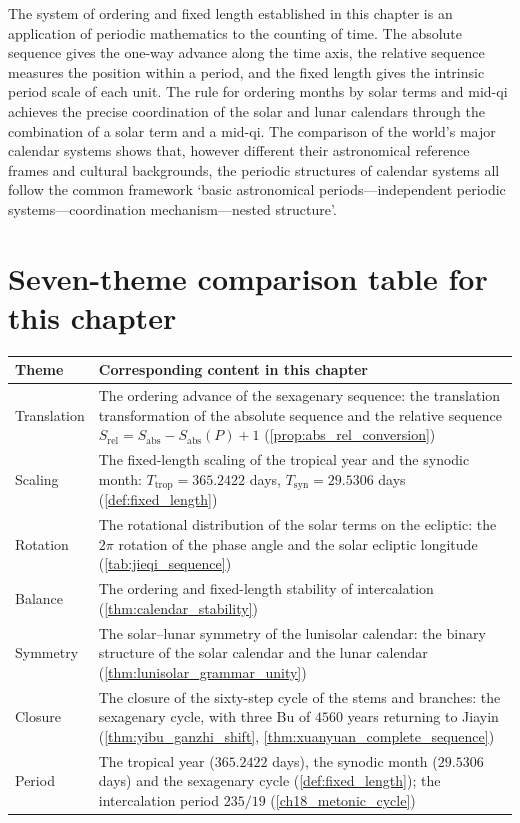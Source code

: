 \begin{remark}\label{rem:calendar_book_interface}
The system of ordering and fixed length established in this chapter is an application of periodic mathematics to the counting of time. The absolute sequence gives the one-way advance along the time axis, the relative sequence measures the position within a period, and the fixed length gives the intrinsic period scale of each unit. The rule for ordering months by solar terms and mid-qi achieves the precise coordination of the solar and lunar calendars through the combination of a solar term and a mid-qi. The comparison of the world's major calendar systems shows that, however different their astronomical reference frames and cultural backgrounds, the periodic structures of calendar systems all follow the common framework `basic astronomical periods---independent periodic systems---coordination mechanism---nested structure'.
\end{remark}

\section*{Seven-theme comparison table for this chapter}

\begin{center}
\renewcommand{\arraystretch}{1.3}
\begin{tabular}{>{\centering\arraybackslash}p{2.8cm}>{\centering\arraybackslash}p{9.9cm}}
\toprule
Theme & Corresponding content in this chapter \\
\midrule
Translation & The ordering advance of the sexagenary sequence: the translation transformation of the absolute sequence and the relative sequence \(S_{\text{rel}}=S_{\text{abs}}-S_{\text{abs}}(P)+1\) (\cref{prop:abs_rel_conversion}) \\
Scaling & The fixed-length scaling of the tropical year and the synodic month: \(T_{\text{trop}}=365.2422\) days, \(T_{\text{syn}}=29.5306\) days (\cref{def:fixed_length}) \\
Rotation & The rotational distribution of the solar terms on the ecliptic: the \(2\pi\) rotation of the phase angle and the solar ecliptic longitude (\cref{tab:jieqi_sequence}) \\
Balance & The ordering and fixed-length stability of intercalation (\cref{thm:calendar_stability}) \\
Symmetry & The solar--lunar symmetry of the lunisolar calendar: the binary structure of the solar calendar and the lunar calendar (\cref{thm:lunisolar_grammar_unity}) \\
Closure & The closure of the sixty-step cycle of the stems and branches: the sexagenary cycle, with three Bu of \(4560\) years returning to Jiayin (\cref{thm:yibu_ganzhi_shift}, \cref{thm:xuanyuan_complete_sequence}) \\
Period & The tropical year (\(365.2422\) days), the synodic month (\(29.5306\) days) and the sexagenary cycle (\cref{def:fixed_length}); the intercalation period \(235/19\) (\cref{ch18_metonic_cycle}) \\
\bottomrule
\end{tabular}
\end{center}

